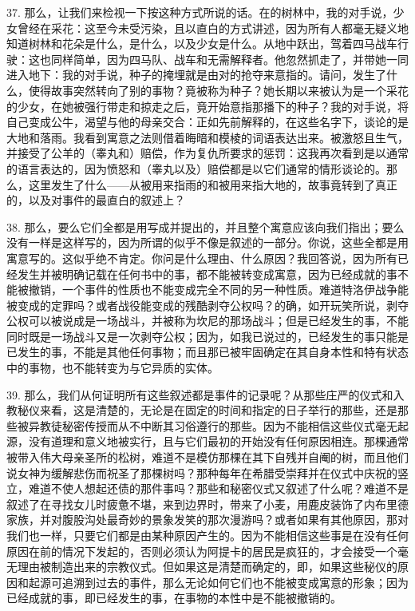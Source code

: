 37. 那么，让我们来检视一下按这种方式所说的话。在的树林中，我的对手说，少女曾经在采花：这至今未受污染，且以直白的方式讲述，因为所有人都毫无疑义地知道树林和花朵是什么，是什么，以及少女是什么。从地中跃出，驾着四马战车行驶：这也同样简单，因为四马队、战车和无需解释者。他忽然抓走了，并带她一同进入地下：我的对手说，种子的掩埋就是由对的抢夺来意指的。请问，发生了什么，使得故事突然转向了别的事物？竟被称为种子？她长期以来被认为是一个采花的少女，在她被强行带走和掠走之后，竟开始意指那播下的种子？我的对手说，将自己变成公牛，渴望与他的母亲交合：正如先前解释的，在这些名字下，谈论的是大地和落雨。我看到寓意之法则借着晦暗和模棱的词语表达出来。被激怒且生气，并接受了公羊的（睾丸和）赔偿，作为复仇所要求的惩罚：这我再次看到是以通常的语言表达的，因为愤怒和（睾丸以及）赔偿都是以它们通常的情形谈论的。那么，这里发生了什么——从被用来指雨的和被用来指大地的，故事竟转到了真正的，以及对事件的最直白的叙述上？\par

38. 那么，要么它们全都是用写成并提出的，并且整个寓意应该向我们指出；要么没有一样是这样写的，因为所谓的似乎不像是叙述的一部分。你说，这些全都是用寓意写的。这似乎绝不肯定。你问是什么理由、什么原因？我回答说，因为所有已经发生并被明确记载在任何书中的事，都不能被转变成寓意，因为已经成就的事不能被撤销，一个事件的性质也不能变成完全不同的另一种性质。难道特洛伊战争能被变成的定罪吗？或者战役能变成的残酷剥夺公权吗？的确，如开玩笑所说，剥夺公权可以被说成是一场战斗，并被称为坎尼的那场战斗；但是已经发生的事，不能同时既是一场战斗又是一次剥夺公权；因为，如我已说过的，已经发生的事只能是已发生的事，不能是其他任何事物；而且那已被牢固确定在其自身本性和特有状态中的事物，也不能转变为与它异质的实体。\par

39. 那么，我们从何证明所有这些叙述都是事件的记录呢？从那些庄严的仪式和入教秘仪来看，这是清楚的，无论是在固定的时间和指定的日子举行的那些，还是那些被异教徒秘密传授而从不中断其习俗遵行的那些。因为不能相信这些仪式毫无起源，没有道理和意义地被实行，且与它们最初的开始没有任何原因相连。那棵通常被带入伟大母亲圣所的松树，难道不是模仿那棵在其下自残并自阉的树，而且他们说女神为缓解悲伤而祝圣了那棵树吗？那种每年在希腊受崇拜并在仪式中庆祝的竖立，难道不使人想起还债的那件事吗？那些和秘密仪式又叙述了什么呢？难道不是叙述了在寻找女儿时疲惫不堪，来到边界时，带来了小麦，用鹿皮装饰了内布里德家族，并对腹股沟处最奇妙的景象发笑的那次漫游吗？或者如果有其他原因，那对我们也一样，只要它们都是由某种原因产生的。因为不能相信这些事是在没有任何原因在前的情况下发起的，否则必须认为阿提卡的居民是疯狂的，才会接受一个毫无理由被制造出来的宗教仪式。但如果这是清楚而确定的，即，如果这些秘仪的原因和起源可追溯到过去的事件，那么无论如何它们也不能被变成寓意的形象；因为已经成就的事，即已经发生的事，在事物的本性中是不能被撤销的。\par

